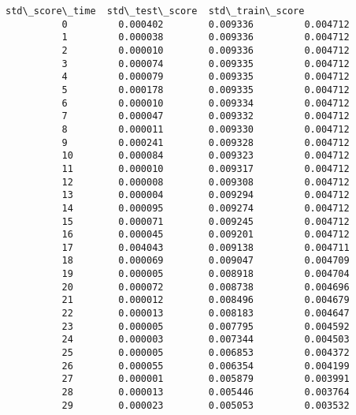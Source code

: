 \documentclass[11pt]{article}
\begin{document}
\begin{Verbatim}[commandchars=\\\{\}]
              std\_score\_time  std\_test\_score  std\_train\_score  
          0         0.000402        0.009336         0.004712  
          1         0.000038        0.009336         0.004712  
          2         0.000010        0.009336         0.004712  
          3         0.000074        0.009335         0.004712  
          4         0.000079        0.009335         0.004712  
          5         0.000178        0.009335         0.004712  
          6         0.000010        0.009334         0.004712  
          7         0.000047        0.009332         0.004712  
          8         0.000011        0.009330         0.004712  
          9         0.000241        0.009328         0.004712  
          10        0.000084        0.009323         0.004712  
          11        0.000010        0.009317         0.004712  
          12        0.000008        0.009308         0.004712  
          13        0.000004        0.009294         0.004712  
          14        0.000095        0.009274         0.004712  
          15        0.000071        0.009245         0.004712  
          16        0.000045        0.009201         0.004712  
          17        0.004043        0.009138         0.004711  
          18        0.000069        0.009047         0.004709  
          19        0.000005        0.008918         0.004704  
          20        0.000072        0.008738         0.004696  
          21        0.000012        0.008496         0.004679  
          22        0.000013        0.008183         0.004647  
          23        0.000005        0.007795         0.004592  
          24        0.000003        0.007344         0.004503  
          25        0.000005        0.006853         0.004372  
          26        0.000055        0.006354         0.004199  
          27        0.000001        0.005879         0.003991  
          28        0.000013        0.005446         0.003764  
          29        0.000023        0.005053         0.003532  
\end{Verbatim}
        
\end{document}
